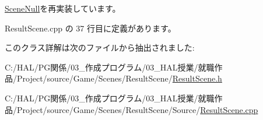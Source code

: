 \mbox{\hyperlink{class_scene_null_abbff54a7323b5ccde4b5094757747738}{Scene\+Null}}を再実装しています。



 Result\+Scene.\+cpp の 37 行目に定義があります。



このクラス詳解は次のファイルから抽出されました\+:\begin{DoxyCompactItemize}
\item 
C\+:/\+H\+A\+L/\+P\+G関係/03\+\_\+作成プログラム/03\+\_\+\+H\+A\+L授業/就職作品/\+Project/source/\+Game/\+Scenes/\+Result\+Scene/\mbox{\hyperlink{_result_scene_8h}{Result\+Scene.\+h}}\item 
C\+:/\+H\+A\+L/\+P\+G関係/03\+\_\+作成プログラム/03\+\_\+\+H\+A\+L授業/就職作品/\+Project/source/\+Game/\+Scenes/\+Result\+Scene/\+Source/\mbox{\hyperlink{_result_scene_8cpp}{Result\+Scene.\+cpp}}\end{DoxyCompactItemize}
